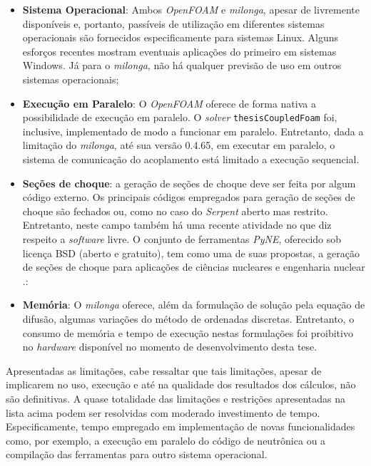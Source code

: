 \begin{itemize}
\item \textbf{Sistema Operacional}: Ambos \textit{OpenFOAM} e \textit{milonga}, apesar de livremente disponíveis e,
  portanto, passíveis de utilização em diferentes sistemas operacionais são fornecidos especificamente
  para sistemas Linux. Alguns esforços recentes mostram eventuais aplicações do primeiro em sistemas
  Windows. Já para o \textit{milonga}, não há qualquer previsão de uso em outros sistemas operacionais;
\item \textbf{Execução em Paralelo}: O \textit{OpenFOAM} oferece de forma nativa a possibilidade de execução em
  paralelo. O \textit{solver} \texttt{thesisCoupledFoam} foi, inclusive, implementado de modo a funcionar em paralelo.
  Entretanto, dada a limitação do \textit{milonga}, até sua versão 0.4.65, em executar em paralelo, o sistema
  de comunicação do acoplamento está limitado a execução sequencial.
\item \textbf{Seções de choque}: a geração de seções de choque deve ser feita por algum código externo. Os
  principais códigos empregados para geração de seções de choque são fechados ou, como no
  caso do \textit{Serpent} aberto mas restrito. Entretanto, neste campo também há uma recente
  atividade no que diz respeito a \textit{software} livre. O conjunto de ferramentas \textit{PyNE},
  oferecido sob licença BSD (aberto e gratuito), tem como uma de suas propostas, a geração de seções
  de choque para aplicações de ciências nucleares e engenharia nuclear \cite{Slaybaugh20014}.:
\item \textbf{Memória}: O \textit{milonga} oferece, além da formulação de solução pela equação de difusão,
  algumas variações do método de ordenadas discretas. Entretanto, o consumo de memória e tempo de execução
  nestas formulações foi proibitivo no \textit{hardware} disponível no momento de desenvolvimento desta tese.
\end{itemize}

Apresentadas as limitações, cabe ressaltar que tais limitações, apesar de implicarem no uso,
execução e até na qualidade dos resultados dos cálculos, não são definitivas.
A quase totalidade das limitações e restrições apresentadas na lista
acima podem ser resolvidas com moderado investimento de tempo. Especificamente, tempo empregado em implementação
de novas funcionalidades como, por exemplo, a execução em paralelo do código de neutrônica ou a compilação
das ferramentas para outro sistema operacional.

